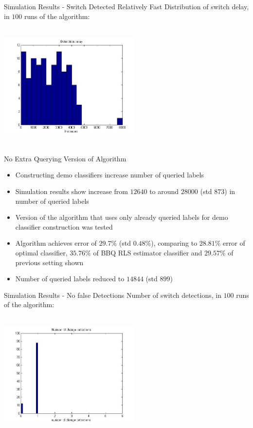 \documentclass{beamer}
\begin{document}
\begin{frame}{Simulation Results - Switch Detected Relatively Fast}
Distribution of switch delay, in $100$ runs of the algorithm:
\begin{center}
\includegraphics[height=2.5in,width=2.8in]{delay_clas_alg2_ver1.jpg}
\end{center}
\end{frame}

\begin{frame}{No Extra Querying Version of Algorithm}
\begin{itemize}
\item Constructing demo classifiers increase number of queried labels\newline
\item Simulation results show increase from $12640$ to around $28000$ (std $873$) in number of queried labels\newline 
\item Version of the algorithm that uses only already queried labels for demo classifier construction was tested\newline
\item Algorithm achieves error of $29.7\%$ (std $0.48\%$), comparing to $28.81\%$ error of optimal classifier, $35.76\%$ of BBQ RLS estimator classifier and $29.57\%$ of previous setting shown\newline
\item Number of queried labels reduced to $14844$ (std $899$)
\end{itemize}
\end{frame}

\begin{frame}{Simulation Results - No false Detections}
Number of switch detections, in $100$ runs of the algorithm:
\begin{center}
\includegraphics[height=2.5in,width=2.8in]{Ndet_clas_alg3_ver1_small.jpg}
\end{center}
\end{frame}
\end{document}
